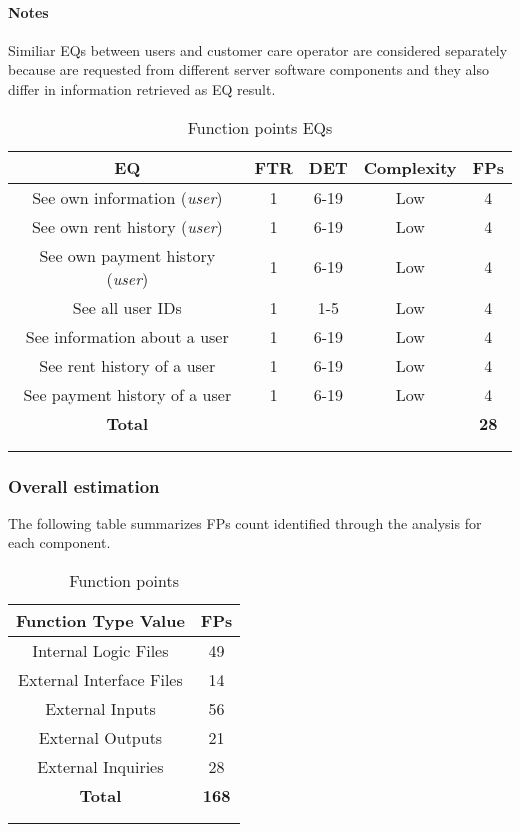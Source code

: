 \paragraph{Notes} Similiar EQs between users and customer care operator are considered separately because are requested from different server software components and they also differ in information retrieved as EQ result. \\

\clearpage

\begin{longtable}{ccccc}
\toprule
\textbf{EQ}	& FTR & DET & 	Complexity  & \textbf{FPs}\\
\midrule
See own information (\emph{user}) & 1 & 6-19 & Low & 4\\
See own rent history (\emph{user}) & 1 & 6-19 & Low & 4\\
See own payment history (\emph{user}) & 1 & 6-19 & Low & 4\\
See all user IDs & 1 & 1-5 & Low & 4\\
See information about a user & 1 & 6-19 & Low & 4\\
See rent history of a user & 1 & 6-19 & Low & 4\\
See payment history of a user & 1 & 6-19 & Low & 4\\
\midrule
\textbf{Total} & & & &  \textbf{28}\\
\bottomrule \\
\caption{Function points EQs}
\label{tbl:eqFP}
\end{longtable}

\subsubsection{Overall estimation}
\label{sec:FPResult}
The following table summarizes FPs count identified through the analysis for each component.\\
\begin{longtable}{cc}
\toprule
\textbf{Function Type Value}  & \textbf{FPs}\\
\midrule
Internal Logic Files & 49 \\
External Interface Files & 14 \\
External Inputs & 56 \\
External Outputs &  21\\
External Inquiries & 28 \\
\midrule
\textbf{Total} & \textbf{168}\\
\bottomrule \\
\caption{Function points}
\label{tbl:FP}
\end{longtable}

